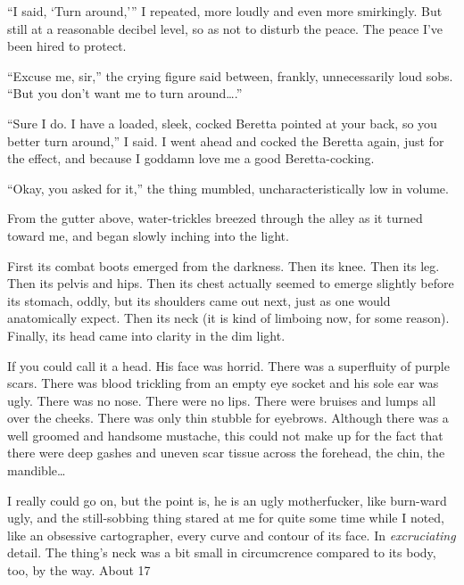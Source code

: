 ``I said, `Turn around,''' I repeated, more
loudly and even more smirkingly. But still at a reasonable decibel
level, so as not to disturb the peace. The peace I've been
hired to protect.



``Excuse me, sir,'' the crying figure said between,
frankly, unnecessarily loud sobs. ``But you don't want
me to turn around{\ldots}.''



``Sure I do. I have a loaded, sleek, cocked Beretta pointed at
your back, so you better turn around,'' I said. I went ahead
and cocked the Beretta again, just for the effect, and because I
goddamn love me a good Beretta-cocking.



``Okay, you asked for it,'' the thing mumbled,
uncharacteristically low in volume.



From the gutter above, water-trickles breezed through the alley as
it turned toward me, and began slowly inching into the light.



First its combat boots emerged from the darkness. Then its knee.
Then its leg. Then its pelvis and hips. Then its chest actually
seemed to emerge slightly before its stomach, oddly, but its
shoulders came out next, just as one would anatomically expect.
Then its neck (it is kind of limboing now, for some reason).
Finally, its head came into clarity in the dim light.



If you could call it a head. His face was horrid. There was a
superfluity of purple scars. There was blood trickling from an
empty eye socket and his sole ear was ugly. There was no nose.
There were no lips. There were bruises and lumps all over the
cheeks. There was only thin stubble for eyebrows. Although there
was a well groomed and handsome mustache, this could not make up
for the fact that there were deep gashes and uneven scar tissue
across the forehead, the chin, the mandible{\ldots}



I really could go on, but the point is, he is an ugly motherfucker,
like burn-ward ugly, and the still-sobbing thing stared at me for
quite some time while I noted, like an obsessive cartographer,
every curve and contour of its face. In {\em excruciating} detail.
The thing's neck was a bit small in circumcrence compared to
its body, too, by the way. About 17%



